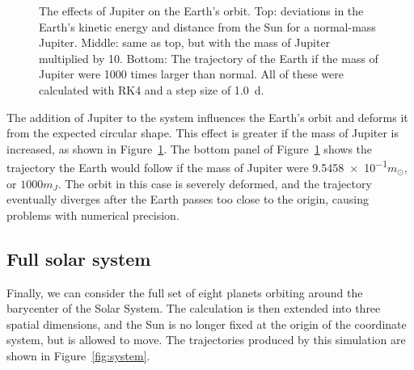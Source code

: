 \documentclass[aps,prc,reprint]{revtex4-1}
\newcommand{\sun}[0]{\ensuremath{\odot}}
\begin{document}
\begin{figure}
            \caption{The effects of Jupiter on the Earth's orbit. Top: deviations in the Earth's kinetic energy and distance from the Sun for a normal-mass Jupiter. Middle: same as top, but with the mass of Jupiter multiplied by 10. Bottom: The trajectory of the Earth if the mass of Jupiter were 1000 times larger than normal. All of these were calculated with RK4 and a step size of \SI{1.0}{d}.}
            \label{fig:jupiter}
        \end{figure}

        The addition of Jupiter to the system influences the Earth's orbit and deforms it from the expected circular shape. This effect is greater if the mass of Jupiter is increased, as shown in Figure~\ref{fig:jupiter}. The bottom panel of Figure~\ref{fig:jupiter} shows the trajectory the Earth would follow if the mass of Jupiter were \num{9.5458e-1}{$m_\sun$}, or $1000 m_J$. The orbit in this case is severely deformed, and the trajectory eventually diverges after the Earth passes too close to the origin, causing problems with numerical precision.

    \subsection{Full solar system}
    \label{sub:full}

        Finally, we can consider the full set of eight planets orbiting around the barycenter of the Solar System. The calculation is then extended into three spatial dimensions, and the Sun is no longer fixed at the origin of the coordinate system, but is allowed to move. The trajectories produced by this simulation are shown in Figure~\ref{fig:system}.
\end{document}
